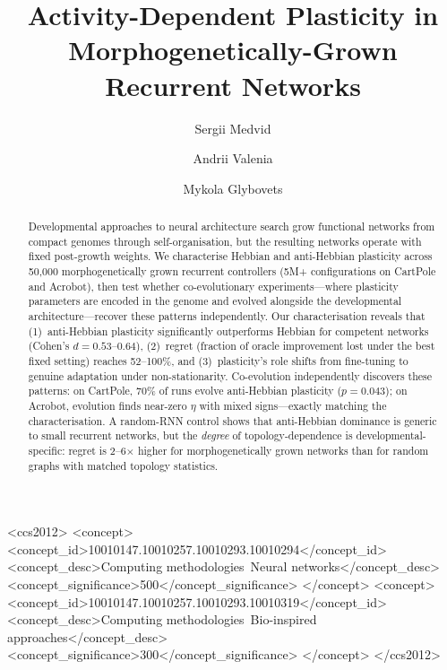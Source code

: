 \documentclass[sigconf,nonacm]{acmart}
\begin{document}
\title{Activity-Dependent Plasticity in Morphogenetically-Grown Recurrent Networks}

\author{Sergii Medvid}

\author{Andrii Valenia}

\author{Mykola Glybovets}

\begin{CCSXML}
<ccs2012>
<concept>
<concept_id>10010147.10010257.10010293.10010294</concept_id>
<concept_desc>Computing methodologies~Neural networks</concept_desc>
<concept_significance>500</concept_significance>
</concept>
<concept>
<concept_id>10010147.10010257.10010293.10010319</concept_id>
<concept_desc>Computing methodologies~Bio-inspired approaches</concept_desc>
<concept_significance>300</concept_significance>
</concept>
</ccs2012>
\end{CCSXML}


\begin{abstract}
Developmental approaches to neural architecture search grow functional networks from compact genomes through self-organisation, but the resulting networks operate with fixed post-growth weights.
We characterise Hebbian and anti-Hebbian plasticity across 50{,}000 morphogenetically grown recurrent controllers (5M+ configurations on CartPole and Acrobot), then test whether co-evolutionary experiments---where plasticity parameters are encoded in the geno\-me and evolved alongside the developmental architecture---recover these patterns independently.
Our characterisation reveals that (1)~anti-Hebbian plasticity significantly outperforms Hebbian for competent networks (Cohen's $d = 0.53$--$0.64$), (2)~regret (fraction of oracle improvement lost under the best fixed setting) reaches 52--100\%, and (3)~plasticity's role shifts from fine-tuning to genuine adaptation under non-stationarity.
Co-evolution independently discovers these patterns: on CartPole, 70\% of runs evolve anti-Hebbian plasticity ($p = 0.043$); on Acrobot, evolution finds near-zero $\eta$ with mixed signs---exactly matching the characterisation.
A random-RNN control shows that anti-Hebbian dominance is generic to small recurrent networks, but the \emph{degree} of topology-dependence is developmental-specific: regret is 2--6$\times$ higher for morphogenetically grown networks than for random graphs with matched topology statistics.
\end{abstract}
\end{document}
